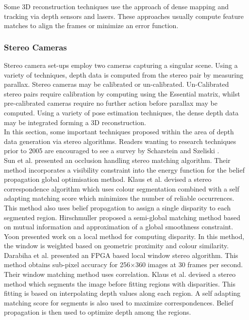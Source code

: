 Some 3D reconstruction techniques use the approach of dense mapping and tracking via depth sensors and lasers. These approaches usually compute feature matches to align the frames or minimize an error function.


\subsubsection{Stereo Cameras}

\label{StereoMethodsSection}

Stereo camera set-ups employ two cameras capturing a singular scene. Using a variety of techniques, depth data is computed from the stereo pair by measuring parallax. Stereo cameras may be calibrated or un-calibrated. Un-Calibrated stereo pairs require calibration by computing using the Essential matrix, whilst pre-calibrated cameras require no further action before parallax may be computed. Using a variety of pose estimation techniques, the dense depth data may be integrated forming a 3D reconstruction. \\

In this section, some important techniques proposed within the area of depth data generation via stereo algorithms. Readers wanting to research techniques prior to 2005 are encouraged to see a survey by Scharstein and Szeliski \cite{Scharstein02Taxonomy}. \\


Sun et al. \cite{Sun05Symmetric} presented an occlusion handling stereo matching algorithm. Their method incorporates a visibility constraint into the energy function for the belief propagation global optimisation method. Klaus et al. \cite{Klaus06Segment} devised a stereo correspondence algorithm which uses colour segmentation combined with a self adapting matching score which minimizes the number of reliable occurrences. This method also uses belief propagation to assign a single disparity to each segmented region. Hirschmuller \cite{Hirschmuller05Accurate} proposed a semi-global matching method based on mutual information and approximation of a global smoothness constraint. \\

Yoon \cite{Yoon06Adaptive} presented work on a local method for computing disparity. In this method, the window is weighted based on geometric proximity and colour similarity. Darabiha et al. \cite{Darabiha06Reconfigurable} presented an FPGA based local window stereo algorithm. This method obtains sub-pixel accuracy for 256$\times$360 images at 30 frames per second. Their window matching method uses correlation. Klaus et al. \cite{Klaus06Segment} devised a stereo method which segments the image before fitting regions with disparities. This fitting is based on interpolating depth values along each region. A self adapting matching score for segments is also used to maximize correspondences. Belief propagation is then used to optimize depth among the regions. \\


